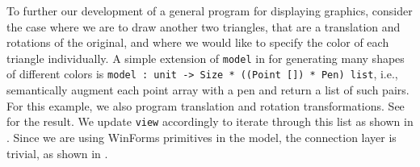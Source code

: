 \documentclass[fsharpnotes.tex]{subfiles}
\begin{document}
To further our development of a general program for displaying graphics, consider the case where we are to draw another two triangles, that are a translation and rotations of the original, and where we would like to specify the color of each triangle individually. A simple extension of \lstinline{model} in  for generating many shapes of different colors is \lstinline{model : unit -> Size * ((Point []) * Pen) list}, i.e., semantically augment each point array with a pen and return a list of such pairs. For this example, we also program translation and rotation transformations. See  for the result.
%
%
We update \lstinline{view} accordingly to iterate through this list as shown in .
%
%
Since we are using WinForms primitives in the model, the connection layer is trivial, as shown in .
%

\end{document}
